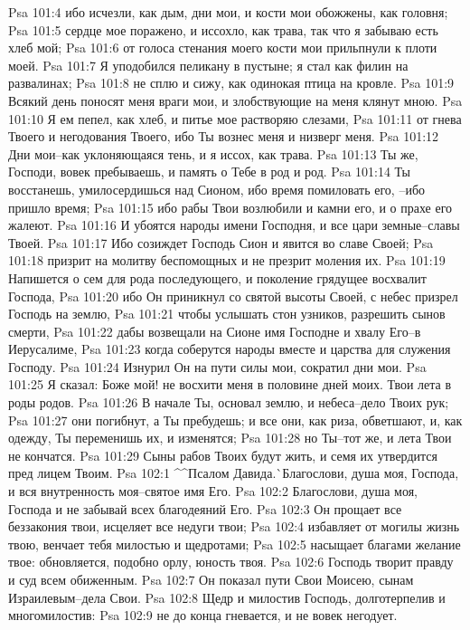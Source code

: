 Psa 101:4  ибо исчезли, как дым, дни мои, и кости мои обожжены, как головня;
Psa 101:5  сердце мое поражено, и иссохло, как трава, так что я забываю есть хлеб мой;
Psa 101:6  от голоса стенания моего кости мои прильпнули к плоти моей.
Psa 101:7  Я уподобился пеликану в пустыне; я стал как филин на развалинах;
Psa 101:8  не сплю и сижу, как одинокая птица на кровле.
Psa 101:9  Всякий день поносят меня враги мои, и злобствующие на меня клянут мною.
Psa 101:10  Я ем пепел, как хлеб, и питье мое растворяю слезами,
Psa 101:11  от гнева Твоего и негодования Твоего, ибо Ты вознес меня и низверг меня.
Psa 101:12  Дни мои--как уклоняющаяся тень, и я иссох, как трава.
Psa 101:13  Ты же, Господи, вовек пребываешь, и память о Тебе в род и род.
Psa 101:14  Ты восстанешь, умилосердишься над Сионом, ибо время помиловать его, --ибо пришло время;
Psa 101:15  ибо рабы Твои возлюбили и камни его, и о прахе его жалеют.
Psa 101:16  И убоятся народы имени Господня, и все цари земные--славы Твоей.
Psa 101:17  Ибо созиждет Господь Сион и явится во славе Своей;
Psa 101:18  призрит на молитву беспомощных и не презрит моления их.
Psa 101:19  Напишется о сем для рода последующего, и поколение грядущее восхвалит Господа,
Psa 101:20  ибо Он приникнул со святой высоты Своей, с небес призрел Господь на землю,
Psa 101:21  чтобы услышать стон узников, разрешить сынов смерти,
Psa 101:22  дабы возвещали на Сионе имя Господне и хвалу Его--в Иерусалиме,
Psa 101:23  когда соберутся народы вместе и царства для служения Господу.
Psa 101:24  Изнурил Он на пути силы мои, сократил дни мои.
Psa 101:25  Я сказал: Боже мой! не восхити меня в половине дней моих. Твои лета в роды родов.
Psa 101:26  В начале Ты, основал землю, и небеса--дело Твоих рук;
Psa 101:27  они погибнут, а Ты пребудешь; и все они, как риза, обветшают, и, как одежду, Ты переменишь их, и изменятся;
Psa 101:28  но Ты--тот же, и лета Твои не кончатся.
Psa 101:29  Сыны рабов Твоих будут жить, и семя их утвердится пред лицем Твоим.
Psa 102:1  ^^Псалом Давида.^^ Благослови, душа моя, Господа, и вся внутренность моя--святое имя Его.
Psa 102:2  Благослови, душа моя, Господа и не забывай всех благодеяний Его.
Psa 102:3  Он прощает все беззакония твои, исцеляет все недуги твои;
Psa 102:4  избавляет от могилы жизнь твою, венчает тебя милостью и щедротами;
Psa 102:5  насыщает благами желание твое: обновляется, подобно орлу, юность твоя.
Psa 102:6  Господь творит правду и суд всем обиженным.
Psa 102:7  Он показал пути Свои Моисею, сынам Израилевым--дела Свои.
Psa 102:8  Щедр и милостив Господь, долготерпелив и многомилостив:
Psa 102:9  не до конца гневается, и не вовек негодует.
